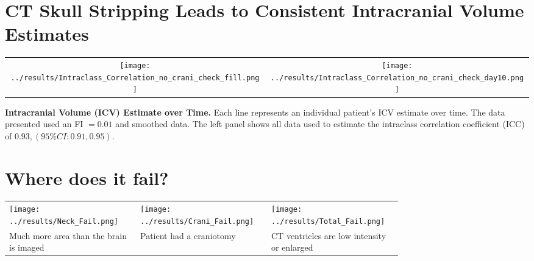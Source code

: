 \documentclass[final]{beamer}\usepackage[]{graphicx}\usepackage[]{color}
\begin{document}
\begin{frame}[fragile]
\begin{minipage}{0.39\linewidth}
\vfill

\end{minipage}
\begin{minipage}{0.39\linewidth}


%

\section{ CT Skull Stripping Leads to Consistent Intracranial Volume Estimates}

\begin{tabular}{cc}
	\texttt{[image: ../results/Intraclass\_Correlation\_no\_crani\_check\_fill.png]} &
	\texttt{[image: ../results/Intraclass\_Correlation\_no\_crani\_check\_day10.png]} 
\end{tabular}

{\bf Intracranial Volume (ICV) Estimate over Time.}  Each line represents an individual patient's ICV estimate over time.  The data presented used an FI $= 0.01$ and smoothed data.   The left panel shows all data used to estimate the intraclass correlation coefficient (ICC) of $0.93, (95\% CI: 0.91, 0.95)$.  

%

\section{Where does it fail?}
\begin{center}
\begin{tabular}{>{\centering}m{0.25\linewidth}>{\centering}m{0.25\linewidth}>{\centering\arraybackslash}m{0.25\linewidth}}
\texttt{[image: ../results/Neck\_Fail.png]} &
\texttt{[image: ../results/Crani\_Fail.png]} & 
\texttt{[image: ../results/Total\_Fail.png]} \\
Much more area than the brain is imaged &
Patient had a craniotomy & 
CT ventricles are low intensity or enlarged 
\end{tabular}
\end{center}


\end{minipage}
\end{frame}
\end{document}
